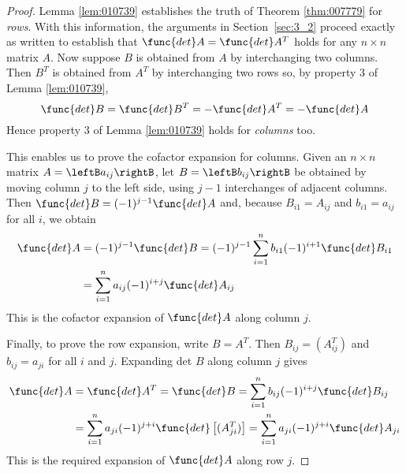 \begin{proof}
Lemma \ref{lem:010739} establishes the truth of Theorem \ref{thm:007779} for \textit{rows}. With this information, the arguments in Section~\ref{sec:3_2} proceed exactly as written to establish that $\func{det }A = \func{det }A^{T}$ holds for any $n \times n$ matrix $A$. Now suppose $B$ is obtained from $A$ by interchanging two columns. Then $B^{T}$ is obtained from $A^{T}$ by interchanging two rows so, by property 3 of Lemma \ref{lem:010739},
\begin{equation*}
\func{det } B = \func{det } B^T = -\func{det } A^T = -\func{det } A
\end{equation*}
Hence property 3 of Lemma \ref{lem:010739} holds for \textit{columns} too.


This enables us to prove the cofactor expansion for columns. Given an $n \times n$ matrix $A = \leftB a_{ij} \rightB$, let $B = \leftB b_{ij} \rightB$ be obtained by moving column $j$ to the left side, using $j - 1$ interchanges of adjacent columns. Then $\func{det }B = (-1)^{j-1} \func{det }A$ and, because $B_{i1} = A_{ij}$ and $b_{i1} = a_{ij}$ for all $i$, we obtain
\begin{align*}
\func{det } A & = (-1)^{j-1} \func{det } B = (-1)^{j-1} \sum_{i=1}^n b_{i1}(-1)^{i+1} \func{det } B_{i1}\\
&= \sum_{i=1}^n a_{ij} (-1)^{i+j} \func{det } A_{ij}
\end{align*}
This is the cofactor expansion of $\func{det }A$ along column $j$.


Finally, to prove the row expansion, write $B = A^{T}$. Then $B_{ij} = (A_{ij}^T)$ and $b_{ij} = a_{ji}$ for all $i$ and $j$. Expanding det $B$ along column $j$ gives
\begin{align*}
\func{det } A &=\func{det } A^T = \func{det } B = \sum_{i=1}^n b_{ij} (-1)^{i+j} \func{det } B_{ij} \\
&= \sum_{i=1}^n a_{ji}(-1)^{j+i} \func{det} \left[ (A_{ji}^T)\right] = \sum_{i=1}^n a_{ji} (-1)^{j+i} \func{det } A_{ji}
\end{align*}
This is the required expansion of $\func{det }A$ along row $j$.
\end{proof}
